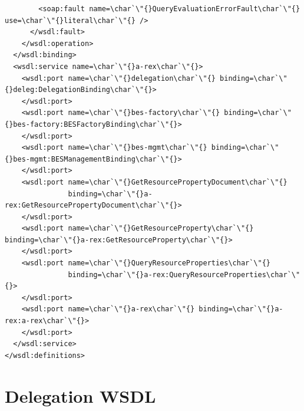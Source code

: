 \documentclass{article}                            %
\begin{document}
\begin{footnotesize}
\begin{verbatim}
        <soap:fault name=\char`\"{}QueryEvaluationErrorFault\char`\"{} use=\char`\"{}literal\char`\"{} />
      </wsdl:fault>
    </wsdl:operation>
  </wsdl:binding>
  <wsdl:service name=\char`\"{}a-rex\char`\"{}>
    <wsdl:port name=\char`\"{}delegation\char`\"{} binding=\char`\"{}deleg:DelegationBinding\char`\"{}>
    </wsdl:port>
    <wsdl:port name=\char`\"{}bes-factory\char`\"{} binding=\char`\"{}bes-factory:BESFactoryBinding\char`\"{}>
    </wsdl:port>
    <wsdl:port name=\char`\"{}bes-mgmt\char`\"{} binding=\char`\"{}bes-mgmt:BESManagementBinding\char`\"{}>
    </wsdl:port>
    <wsdl:port name=\char`\"{}GetResourcePropertyDocument\char`\"{}
               binding=\char`\"{}a-rex:GetResourcePropertyDocument\char`\"{}>
    </wsdl:port>
    <wsdl:port name=\char`\"{}GetResourceProperty\char`\"{} binding=\char`\"{}a-rex:GetResourceProperty\char`\"{}>
    </wsdl:port>
    <wsdl:port name=\char`\"{}QueryResourceProperties\char`\"{}
               binding=\char`\"{}a-rex:QueryResourceProperties\char`\"{}>
    </wsdl:port>
    <wsdl:port name=\char`\"{}a-rex\char`\"{} binding=\char`\"{}a-rex:a-rex\char`\"{}>
    </wsdl:port>
  </wsdl:service>
</wsdl:definitions>
\end{verbatim}
\end{footnotesize}

\section{Delegation WSDL\label{annex:delegation-wsdl}}
\end{document}
